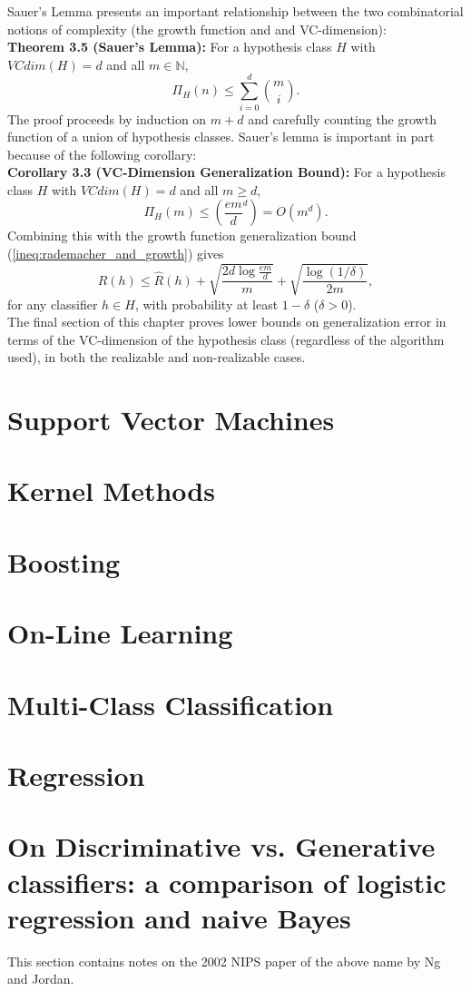 \documentclass[10pt]{article}
\newcommand{\N}{\mathbb{N}}                         %
\renewcommand{\hat}{\widehat}
\begin{document}
Sauer's Lemma presents an important relationship between the two combinatorial
notions of complexity (the growth function and and VC-dimension): \\

{\bf Theorem 3.5 (Sauer's Lemma):} For a hypothesis class $H$ with
$VCdim(H) = d$ and all $m \in \N$,
\[\Pi_H(n) \leq \sum_{i = 0}^d \binom{m}{i}.\]
The proof proceeds by induction on $m + d$ and carefully counting the growth
function of a union of hypothesis classes. Sauer's lemma is important in part
because of the following corollary: \\

{\bf Corollary 3.3 (VC-Dimension Generalization Bound):} For a hypothesis class
$H$ with $VCdim(H) = d$ and all $m \geq d$,
\[\Pi_H(m) \leq \left( \frac{em}{d}^d \right) = O(m^d).\]
Combining this with the growth function generalization bound
(\ref{ineq:rademacher_and_growth}) gives
\begin{equation}
R(h) \leq \hat R(h) + \sqrt{\frac{2 d \log \frac{em}{d}}{m}}
                    + \sqrt{\frac{\log (1/\delta)}{2m}},
\label{ineq:growth_gen_bound}
\end{equation}
for any classifier $h \in H$, with probability at least $1 - \delta$
($\delta > 0$). \\

The final section of this chapter proves lower bounds on generalization error
in terms of the VC-dimension of the hypothesis class (regardless of the
algorithm used), in both the realizable and non-realizable cases.

\newpage
\section{Support Vector Machines}

\section{Kernel Methods}

\section{Boosting}

\section{On-Line Learning}

\section{Multi-Class Classification}

\section{Regression}

\section{On Discriminative vs. Generative classifiers: a comparison of logistic
regression and naive Bayes}
This section contains notes on the 2002 NIPS paper of the above name by Ng and
Jordan.
\end{document}
